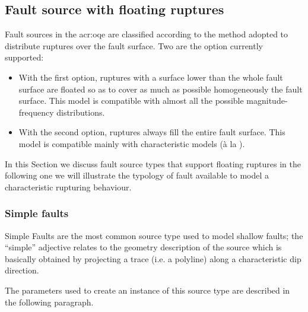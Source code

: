 \subsection{Fault source with floating ruptures}
%
Fault sources in the \gls{acr:oqe} are classified according to the method 
adopted to distribute ruptures over the fault surface. 
Two are the option currently supported: 
\begin{itemize}
    \item With the first option, ruptures with a surface lower than the 
		whole fault surface are floated so as to cover as much as 
		possible homogeneously the fault surface.
        This model is compatible with almost all the possible 
        magnitude-frequency distributions.
    \item With the second option, ruptures always fill the entire fault 
		surface. This model is 
        compatible mainly with characteristic models (\`{a} la 
        \cite{schwartz1984}).
\end{itemize}
In this Section we discuss fault source types that support floating ruptures
in the following one we will illustrate the typology of fault available to 
model a characteristic rupturing behaviour.
%
\subsubsection{Simple faults}
%
Simple Faults are the most common source type used to model shallow 
faults; the ``simple'' adjective relates to the geometry description 
of the source which is basically obtained by projecting a trace 
(i.e. a polyline) along a characteristic dip direction. 

The parameters used to create an instance of this 
source type are described in the following paragraph.
%
